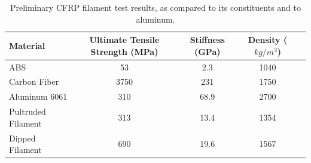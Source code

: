 \begin{table}[h]
    \centering
    \begin{tabular}{lcccc}
        Material           & Ultimate Tensile Strength (MPa)   & Stiffness (GPa)    & Density ($ kg/m^{3} $)  \\ \hline
        ABS                & 53                                & 2.3                & 1040 \\
        Carbon Fiber       & 3750                              & 231                & 1750 \\
        Aluminum 6061      & 310                               & 68.9               & 2700 \\
        Pultruded Filament & 313                               & 13.4               & 1354 \\ 
        Dipped Filament    & 690                               & 19.6               & 1567 \\
    \end{tabular}
    \caption{Preliminary CFRP filament test results, as compared to its constituents and to aluminum.}
    \label{tab:test-results}
\end{table}
